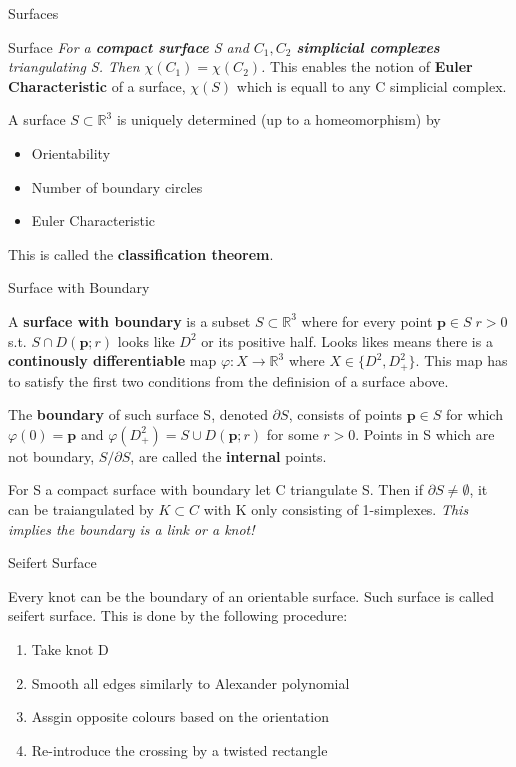 \documentclass[12pt, letterpaper]{article}
\begin{document}
\begin{section}{Surfaces}
\begin{subsection}{Surface}
    \emph{For a \textbf{compact surface} S and \(C_{1}, C_{2}\) \textbf{simplicial
        complexes} triangulating S. Then \(\chi(C_{1}) = \chi(C_{2})\).} This
    enables the notion of \textbf{Euler Characteristic} of a surface, \(\chi(S)\)
    which is equall to any C simplicial complex.

    A surface \(S \subset \mathbb{R}^{3}\) is uniquely determined
    (up to a homeomorphism) by
    \begin{itemize}
      \item Orientability
      \item Number of boundary circles
      \item Euler Characteristic
    \end{itemize}
    This is called the \textbf{classification theorem}.

  \end{subsection}

  \begin{subsection}{Surface with Boundary}

    A \textbf{surface with boundary} is a subset \(S \subset \mathbb{R}^{3}\)
    where for every point \(\textbf{p} \in S \; r > 0\) s.t.
    \(S \cap D(\textbf{p}; r)\) looks like \(D^{2}\) or its positive half.
    Looks likes means there is a \textbf{continously differentiable} map
    \(\varphi: X \to \mathbb{R}^{3}\) where \(X \in \{ D^{2}, D^{2}_{+} \}\).
    This map has to satisfy the first two conditions from the definision of a
    surface above.

    The \textbf{boundary} of such surface S, denoted \(\partial S\), consists of
    points \(\textbf{p} \in S\) for which \(\varphi(0) = \textbf{p}\) and
    \(\varphi(D^{2}_{+}) = S \cup D(\textbf{p}; r)\) for some \(r > 0\).
    Points in S which are not boundary, \(S/\partial S\), are called the
    \textbf{internal} points.

    For S a compact surface with boundary let C triangulate S. Then if
    \(\partial S \neq \emptyset\), it can be traiangulated by \(K \subset C\)
    with K only consisting of 1-simplexes. \emph{This implies the boundary is
    a link or a knot!}

  \end{subsection}

  \begin{subsection}{Seifert Surface}

    Every knot can be the boundary of an orientable surface. Such surface is
    called seifert surface.
    This is done by the following procedure:
    \begin{enumerate}
      \item Take knot D
      \item Smooth all edges similarly to Alexander polynomial
      \item Assgin opposite colours based on the orientation
      \item Re-introduce the crossing by a twisted rectangle
    \end{enumerate}


\end{subsection}
\end{section}
\end{document}
